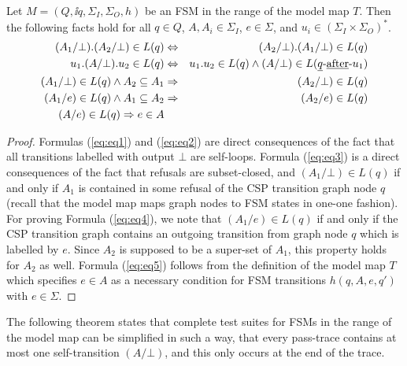 \begin{lemma}\label{lemma:fsmT}
Let $M = (Q,\ii q, \Sigma_I,\Sigma_O,h)$ be an FSM in the range of the model map $T$. 
Then the following facts hold for all $q\in Q$, $A, A_i\in\Sigma_I$, $e\in\Sigma$, and 
$u_i \in (\Sigma_I\times\Sigma_O)^*$.
\begin{eqnarray}
(A_1/\bot).(A_2/\bot)\in L(q) & \Leftrightarrow  &(A_2/\bot).(A_1/\bot)\in L(q)
\label{eq:eq1}
\\
u_1.(A/\bot).u_2\in L(q) & \Leftrightarrow & u_1.u_2\in L(q) \wedge 
(A/\bot)\in L(\underline{q}\text{-\underline{after}-} u_1)
\label{eq:eq2}
\\
(A_1/\bot) \in L(q) \wedge A_2\subseteq A_1 & \Rightarrow & (A_2/\bot) \in L(q)
\label{eq:eq3}
\\
(A_1/e) \in L(q) \wedge A_1\subseteq A_2 & \Rightarrow & (A_2/e) \in L(q)
\label{eq:eq4}
\\
(A/e) \in L(q) \Rightarrow e\in A
\label{eq:eq5}
\end{eqnarray}
\end{lemma}
\begin{proof}
Formulas (\ref{eq:eq1}) and (\ref{eq:eq2}) are  direct consequences of the fact that all
transitions labelled with output $\bot$ are self-loops. Formula (\ref{eq:eq3})  is 
a direct consequences of the fact that refusals are subset-closed, and  
$(A_1/\bot) \in L(q)$ if and only if $A_1$ is contained in some refusal of the
CSP transition graph node $q$ (recall that the model map maps graph nodes to FSM states
in one-one fashion). 
For proving Formula (\ref{eq:eq4}), we note that $(A_1/e) \in L(q)$ if and only if
the CSP transition graph contains an outgoing transition from graph node $q$ which is labelled by $e$. Since $A_2$ is supposed to be a super-set of $A_1$, this property holds for $A_2$ as well. Formula (\ref{eq:eq5}) follows from the definition of the 
model map $T$ which specifies $e\in A$ as a necessary condition for FSM transitions $h(q,A,e,q')$ with $e\in \Sigma$.
\end{proof}

The following theorem states that complete test suites for FSMs in the range of the 
model map can be simplified in such a way, that every pass-trace contains at most one
self-transition $(A/\bot)$, and this only occurs at the end of the trace.

